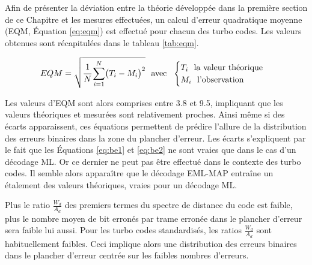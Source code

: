 Afin de présenter la déviation entre la théorie développée dans la première section de ce Chapitre et les mesures 
effectuées, un calcul d'erreur quadratique moyenne (EQM, Équation \ref{eq:eqm}) est effectué pour chacun des turbo codes. 
Les valeurs obtenues sont récapitulées dans le tableau \ref{tab:eqm}.

\begin{equation}
	EQM = \sqrt{\cfrac{1}{N}\sum\limits_{i=1}^N\bigl(T_i-M_i\bigr)^2} \text{~~avec~~} \begin{cases}
		T_i \text{~~la valeur théorique} \\
		M_i \text{~~l'observation}
		\end{cases}
	\label{eq:eqm}
\end{equation}

Les valeurs d'EQM sont alors comprises entre 3.8 et 9.5, impliquant que les valeurs théoriques et mesurées sont 
relativement proches. Ainsi même si des écarts apparaissent, ces équations permettent de prédire l'allure de la distribution
des erreurs binaires dans la zone du plancher d'erreur. Les écarts s'expliquent par le fait que les Équations \ref{eq:be1} 
et \ref{eq:be2} ne sont vraies que dans le cas d'un décodage ML. Or ce dernier ne peut pas être effectué dans le contexte des turbo codes. Il semble alors apparaître que le décodage EML-MAP entraîne un étalement des valeurs théoriques, vraies pour un décodage ML.

Plus le ratio $\frac{W_d}{A_d}$ des premiers termes du spectre de distance du code est faible, plus le nombre moyen de 
bit erronés par trame erronée dans le plancher d'erreur sera faible lui aussi. Pour les turbo codes 
standardisés, les ratios $\frac{W_d}{A_d}$ sont habituellement faibles. Ceci implique alors une distribution des erreurs 
binaires dans le plancher d'erreur centrée sur les faibles nombres d'erreurs.
\begin{table}[t]
\centering
\caption{Erreur quadratique moyenne entre les valeurs théoriques et les simulations Monte-Carlo}
\label{tab:eqm}
\vspace*{-1em}
\end{table}

